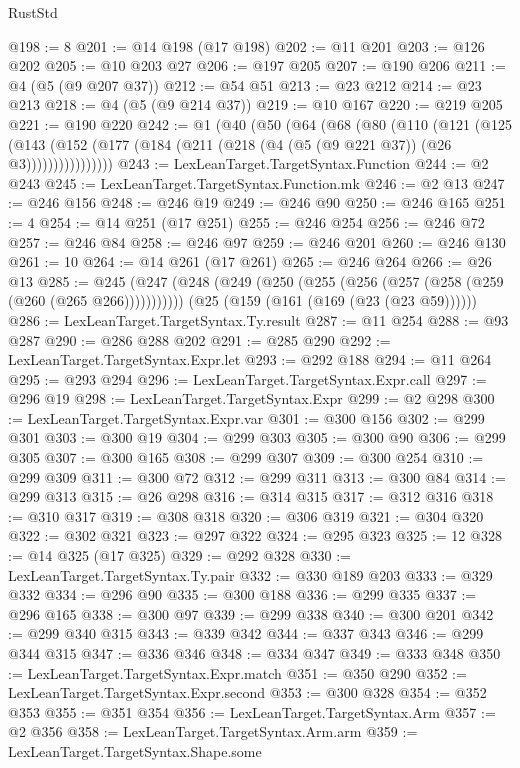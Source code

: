 \begin{lexlean}{RustStd}
\begin{coremodule}
@198 := 8
@201 := @14 @198 (@17 @198)
@202 := @11 @201
@203 := @126 @202
@205 := @10 @203 @27
@206 := @197 @205
@207 := @190 @206
@211 := @4 (@5 (@9 @207 @37))
@212 := @54 @51
@213 := @23 @212
@214 := @23 @213
@218 := @4 (@5 (@9 @214 @37))
@219 := @10 @167
@220 := @219 @205
@221 := @190 @220
@242 := @1
    (@40
      (@50
        (@64
          (@68
            (@80
              (@110
                (@121
                  (@125
                    (@143
                      (@152 (@177 (@184 (@211 (@218 (@4 (@5 (@9 @221 @37)) (@26 @3))))))))))))))))
@243 := LexLeanTarget.TargetSyntax.Function
@244 := @2 @243
@245 := LexLeanTarget.TargetSyntax.Function.mk
@246 := @2 @13
@247 := @246 @156
@248 := @246 @19
@249 := @246 @90
@250 := @246 @165
@251 := 4
@254 := @14 @251 (@17 @251)
@255 := @246 @254
@256 := @246 @72
@257 := @246 @84
@258 := @246 @97
@259 := @246 @201
@260 := @246 @130
@261 := 10
@264 := @14 @261 (@17 @261)
@265 := @246 @264
@266 := @26 @13
@285 := @245
    (@247 (@248 (@249 (@250 (@255 (@256 (@257 (@258 (@259 (@260 (@265 @266)))))))))))
    (@25 (@159 (@161 (@169 (@23 (@23 @59))))))
@286 := LexLeanTarget.TargetSyntax.Ty.result
@287 := @11 @254
@288 := @93 @287
@290 := @286 @288 @202
@291 := @285 @290
@292 := LexLeanTarget.TargetSyntax.Expr.let
@293 := @292 @188
@294 := @11 @264
@295 := @293 @294
@296 := LexLeanTarget.TargetSyntax.Expr.call
@297 := @296 @19
@298 := LexLeanTarget.TargetSyntax.Expr
@299 := @2 @298
@300 := LexLeanTarget.TargetSyntax.Expr.var
@301 := @300 @156
@302 := @299 @301
@303 := @300 @19
@304 := @299 @303
@305 := @300 @90
@306 := @299 @305
@307 := @300 @165
@308 := @299 @307
@309 := @300 @254
@310 := @299 @309
@311 := @300 @72
@312 := @299 @311
@313 := @300 @84
@314 := @299 @313
@315 := @26 @298
@316 := @314 @315
@317 := @312 @316
@318 := @310 @317
@319 := @308 @318
@320 := @306 @319
@321 := @304 @320
@322 := @302 @321
@323 := @297 @322
@324 := @295 @323
@325 := 12
@328 := @14 @325 (@17 @325)
@329 := @292 @328
@330 := LexLeanTarget.TargetSyntax.Ty.pair
@332 := @330 @189 @203
@333 := @329 @332
@334 := @296 @90
@335 := @300 @188
@336 := @299 @335
@337 := @296 @165
@338 := @300 @97
@339 := @299 @338
@340 := @300 @201
@342 := @299 @340 @315
@343 := @339 @342
@344 := @337 @343
@346 := @299 @344 @315
@347 := @336 @346
@348 := @334 @347
@349 := @333 @348
@350 := LexLeanTarget.TargetSyntax.Expr.match
@351 := @350 @290
@352 := LexLeanTarget.TargetSyntax.Expr.second
@353 := @300 @328
@354 := @352 @353
@355 := @351 @354
@356 := LexLeanTarget.TargetSyntax.Arm
@357 := @2 @356
@358 := LexLeanTarget.TargetSyntax.Arm.arm
@359 := LexLeanTarget.TargetSyntax.Shape.some

\end{coremodule}
\end{lexlean}
